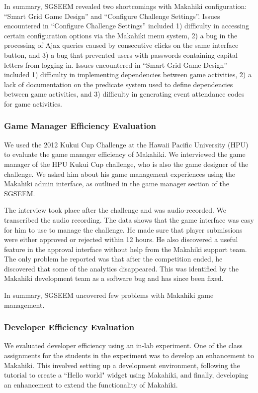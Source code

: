 \documentclass{sigchi}
\begin{document}
In summary, SGSEEM revealed two shortcomings with Makahiki configuration: ``Smart
Grid Game Design'' and ``Configure Challenge Settings''. Issues encountered in ``Configure
Challenge Settings'' included 1) difficulty in accessing certain configuration options via
the Makahiki menu system, 2) a bug in the processing of Ajax queries caused by consecutive
clicks on the same interface button, and 3) a bug that prevented users with passwords
containing capital letters from logging in. Issues encountered in ``Smart Grid Game
Design'' included 1) difficulty in implementing dependencies between game activities, 2) a
lack of documentation on the predicate system used to define dependencies between game
activities, and 3) difficulty in generating event attendance codes for game activities.

\subsubsection{Game Manager Efficiency Evaluation}

We used the 2012 Kukui Cup Challenge at the Hawaii Pacific University (HPU) to evaluate
the game manager efficiency of Makahiki. We interviewed the
game manager of the HPU Kukui Cup challenge, who is also the game designer of the challenge.
We asked him about his game management experiences using the Makahiki admin
interface, as outlined in the game manager section of the SGSEEM.

The interview took place after the challenge and was audio-recorded. We transcribed the
audio recording. The data shows that the game interface was easy for him to use to manage
the challenge. He made sure that player submissions were either approved or rejected
within 12 hours. He also discovered a useful feature in the approval interface without
help from the Makahiki support team. The only problem he reported was that after the
competition ended, he discovered that some of the analytics disappeared. This was
identified by the Makahiki development team as a software bug and has since been fixed.

In summary, SGSEEM uncovered few problems with Makahiki game management. 

\subsubsection{Developer Efficiency Evaluation}

We evaluated developer efficiency using an in-lab experiment. One of the class assignments
for the students in the experiment was to develop an enhancement to Makahiki.  This
involved setting up a development environment, following the tutorial to create a ``Hello
world" widget using Makahiki, and finally, developing an enhancement to extend the
functionality of Makahiki.
\end{document}

